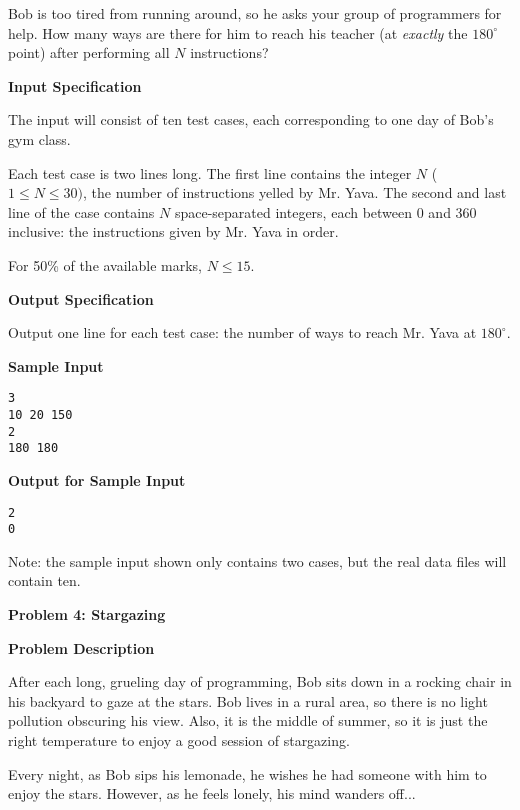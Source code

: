 \documentclass[11pt]{article}
\newcommand{\problem}[2]{\textbf{\Large Problem #1: #2} \vspace{0.4em}}
\newcommand{\heading}[1]{\vspace{0.6em} \textbf{#1}}
\begin{document}
Bob is too tired from running around, so he asks your group of programmers for help. How many ways are there for him to reach his teacher (at \textit{exactly} the $180^{\circ}$ point) after performing all $N$ instructions?


\heading{Input Specification}

The input will consist of ten test cases, each corresponding to one day of Bob's gym class.

Each test case is two lines long. The first line contains the integer $N$ ($1 \le N \le 30)$, the number of instructions yelled by Mr. Yava. The second and last line of the case contains $N$ space-separated integers, each between 0 and 360 inclusive: the instructions given by Mr. Yava in order.

For 50\% of the available marks, $N \le 15$.


\heading{Output Specification}

Output one line for each test case: the number of ways to reach Mr. Yava at $180^{\circ}$.


\heading{Sample Input}
\vspace{-\topsep}
\begin{verbatim}
3
10 20 150
2
180 180
\end{verbatim}

\heading{Output for Sample Input}
\vspace{-\topsep}
\begin{verbatim}
2
0
\end{verbatim}

Note: the sample input shown only contains two cases, but the real data files will contain ten.


\pagebreak




\problem{4}{Stargazing}


\heading{Problem Description}

After each long, grueling day of programming, Bob sits down in a rocking chair in his backyard to gaze at the stars. Bob lives in a rural area, so there is no light pollution obscuring his view. Also, it is the middle of summer, so it is just the right temperature to enjoy a good session of stargazing.

Every night, as Bob sips his lemonade, he wishes he had someone with him to enjoy the stars. However, as he feels lonely, his mind wanders off...
\end{document}
